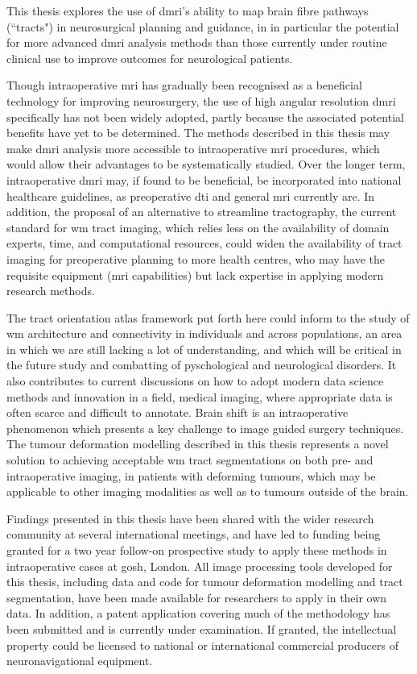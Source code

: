 \begin{impactstatement}

This thesis explores the use of \gls{dmri}'s ability to map brain fibre pathways (``tracts") in neurosurgical planning and guidance, in in particular the potential for more advanced \gls{dmri} analysis methods than those currently under routine clinical use to improve outcomes for neurological patients.

Though intraoperative \gls{mri} has gradually been recognised as a beneficial technology for improving neurosurgery, the use of high angular resolution \gls{dmri} specifically has not been widely adopted, partly because the associated potential benefits have yet to be determined.
The methods described in this thesis may make \gls{dmri} analysis more accessible to intraoperative \gls{mri} procedures, which would allow their advantages to be systematically studied.
Over the longer term, intraoperative \gls{dmri} may, if found to be beneficial, be incorporated into national healthcare guidelines, as preoperative \gls{dti} and general \gls{mri} currently are.
In addition, the proposal of an alternative to streamline tractography, the current standard for \gls{wm} tract imaging, which relies less on the availability of domain experts, time, and computational resources, could widen the availability of tract imaging for preoperative planning to more health centres, who may have the requisite equipment (\gls{mri} capabilities) but lack expertise in applying modern research methods.

The tract orientation atlas framework put forth here could inform to the study of \gls{wm} architecture and connectivity in individuals and across populations, an area in which we are still lacking a lot of understanding, and which will be critical in the future study and combatting of pyschological and neurological disorders.
It also contributes to current discussions on how to adopt modern data science methods and innovation in a field, medical imaging, where appropriate data is often scarce and difficult to annotate.
Brain shift is an intraoperative phenomenon which presents a key challenge to image guided surgery techniques.
The tumour deformation modelling described in this thesis represents a novel solution to achieving acceptable \gls{wm} tract segmentations on both pre- and intraoperative imaging, in patients with deforming tumours, which may be applicable to other imaging modalities as well as to tumours outside of the brain.

Findings presented in this thesis have been shared with the wider research community at several international meetings, and have led to funding being granted for a two year follow-on prospective study to apply these methods in intraoperative cases at \gls{gosh}, London.
All image processing tools developed for this thesis, including data and code for tumour deformation modelling and tract segmentation, have been made available for researchers to apply in their own data.
In addition, a patent application covering much of the methodology has been submitted and is currently under examination.
If granted, the intellectual property could be licensed to national or international commercial producers of neuronavigational equipment.


\end{impactstatement}
